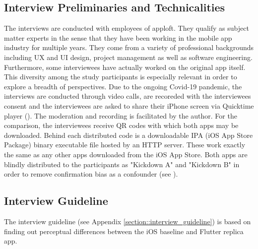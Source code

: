 \subsection{Interview Preliminaries and Technicalities}
The interviews are conducted with employees of apploft. They qualify as subject matter experts in the sense that they have been working in the mobile app industry for multiple years. They come from a variety
of professional backgrounds including UX and UI design, project management as well as software engineering. Furthermore, some interviewees have actually worked on the original app itself. This diversity 
among the study participants is especially relevant in order to explore a breadth of perspectives. 
Due to the ongoing Covid-19 pandemic, the interviews are conducted through video calls, are recoreded with the interviewees consent and the interviewees are asked to share their iPhone screen via Quicktime player (\cite{Apple2014}).
The moderation and recording is facilitated by the author.
For the comparison, the interviewees receive QR codes with which both apps may be downloaded. Behind each distributed code is a downloadable IPA (iOS App Store Package) binary executable file hosted by an HTTP server.
These work exactly the same as any other apps downloaded from the iOS App Store.
Both apps are blindly distributed to the participants as "Kickdown A" and "Kickdown B" in order to remove confirmation bias as a confounder (see \cite{Tversky1974}).

\subsection{Interview Guideline} \label{subsection::interview_guideline}
The interview guideline (see Appendix \ref{section::interview_guideline}) is based on finding out perceptual differences between the iOS baseline and Flutter replica app.

